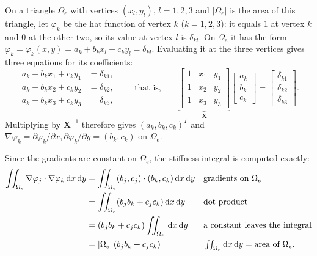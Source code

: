 \documentclass[11pt]{article}
\newcommand{\dxdy}{\,\mathrm{d}x\,\mathrm{d}y}
\newcommand{\abs}[1]{\lvert #1\rvert}
\newcommand{\Om}{\Omega}
\newcommand{\grad}{\nabla}
\begin{document}
On a triangle $\Om_{e}$ with vertices $(x_{l},y_{l})$, $l=1,2,3$ and $|\Om_{e}|$ is the area of this triangle, let
$\varphi_{k}$ be the hat function of vertex $k$ ($k=1,2,3$): it equals $1$
at vertex $k$ and $0$ at the other two, so its value at vertex $l$ is
$\delta_{kl}$.  On $\Om_{e}$ it has the form $\varphi_k = \varphi_k(x, y) = a_{k}+b_{k}x_l+c_{k}y_l = \delta_{kl}$.
 Evaluating it at the three vertices gives three equations for its
coefficients:
\begin{equation}\label{eq:hatK}
  \begin{aligned}
  a_{k}+b_{k}x_{1}+c_{k}y_{1}&=\delta_{k1},\\
  a_{k}+b_{k}x_{2}+c_{k}y_{2}&=\delta_{k2},\\
  a_{k}+b_{k}x_{3}+c_{k}y_{3}&=\delta_{k3},
  \end{aligned}
  \qquad\text{that is,}\qquad
  \underbrace{\begin{bmatrix}1&x_{1}&y_{1}\\1&x_{2}&y_{2}\\1&x_{3}&y_{3}\end{bmatrix}}_{\bm X}
  \begin{bmatrix}a_{k}\\b_{k}\\c_{k}\end{bmatrix}
  =\begin{bmatrix}\delta_{k1}\\\delta_{k2}\\\delta_{k3}\end{bmatrix}.
\end{equation}
  Multiplying by $\bm X^{-1}$ therefore gives $(a_{k},b_{k},c_{k})^{T}$  and
$\grad\varphi_{k}=\partial\varphi_{k}/\partial x, \partial\varphi_{k}/\partial y=(b_{k},c_{k})$ on $\Om_{e}$.
 
Since the gradients are
constant on $\Om_{e}$, the stiffness integral is computed exactly:
\begin{align}
  \iint_{\Om_{e}}\grad\varphi_{j}\cdot\grad\varphi_{k}\dxdy
  &=\iint_{\Om_{e}}(b_{j},c_{j})\cdot(b_{k},c_{k})\dxdy
   &&\text{gradients on } \Om_{e}\notag\\
  &=\iint_{\Om_{e}}(b_{j}b_{k}+c_{j}c_{k})\dxdy
   &&\text{dot product}\notag\\
  &=(b_{j}b_{k}+c_{j}c_{k})\iint_{\Om_{e}}\dxdy
   &&\text{a constant leaves the integral}\notag\\
  &=\abs{\Om_{e}}\,(b_{j}b_{k}+c_{j}c_{k})
   &&\textstyle\iint_{\Om_{e}}\mathrm{d}x\,\mathrm{d}y=\text{area of }\Om_{e} .
  \label{eq:AK}
\end{align}
\end{document}
